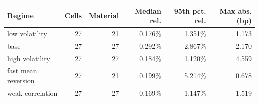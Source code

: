 \begin{tabular}{lrrrrr}
\toprule
Regime & Cells & Material & Median rel. & 95th pct. rel. & Max abs. (bp) \\
\midrule
low volatility & 27 & 21 & 0.176\% & 1.351\% & 1.173 \\
base & 27 & 27 & 0.292\% & 2.867\% & 2.170 \\
high volatility & 27 & 27 & 0.184\% & 1.120\% & 4.559 \\
fast mean reversion & 27 & 21 & 0.199\% & 5.214\% & 0.678 \\
weak correlation & 27 & 27 & 0.169\% & 1.147\% & 1.519 \\
\bottomrule
\end{tabular}
